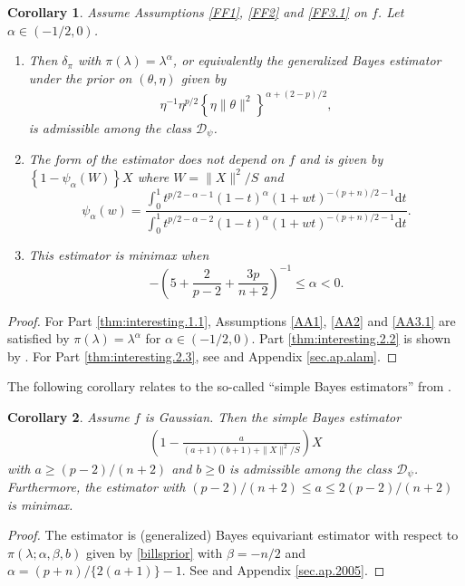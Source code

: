\documentclass[preprint,11pt]{imsart}
\numberwithin{equation}{section}
\theoremstyle{plain}
\newtheorem{corollary}{Corollary}[section]
\theoremstyle{definition}
\theoremstyle{remark}
\newcommand{\rd}{\mathrm{d}}
\begin{document}
\begin{corollary}\label{thm:interesting.2.main}
Assume 
Assumptions \ref{FF1}, \ref{FF2} and \ref{FF3.1} on $f$. Let $\alpha\in(-1/2,0)$.
 \begin{enumerate}
  \item \label{thm:interesting.2.1}
	Then $\delta_\pi$ with $\pi(\lambda)=\lambda^{\alpha} $,
	or equivalently the generalized Bayes estimator under
the prior on $(\theta,\eta)$ given by 
 \begin{align*}
  \eta^{-1}\eta^{p/2}\left\{\eta\|\theta\|^2\right\}^{\alpha+(2-p)/2},
 \end{align*}
	is admissible among the class $\mathcal{D}_\psi$. 
  \item \label{thm:interesting.2.2}
	The form of the estimator does not depend on $f$ and is given by
$\left\{1-\psi_\alpha(W)\right\}X$ where $W=\|X\|^2/S$ and
	\begin{equation}\label{psialphageneral}
 \psi_\alpha(w)=
  \frac{\int_0^1 t^{p/2-\alpha-1}(1-t)^{\alpha}(1+wt)^{-(p+n)/2-1}\rd t}
  {\int_0^1 t^{p/2-\alpha-2}(1-t)^{\alpha}(1+wt)^{-(p+n)/2-1}\rd t}.
	\end{equation}
  \item \label{thm:interesting.2.3}
	This estimator is minimax when
\begin{equation*}
 -\left(5+\frac{2}{p-2}+\frac{3p}{n+2}\right)^{-1} \leq \alpha <0.
\end{equation*}
 \end{enumerate}
\end{corollary}
\begin{proof}
 For Part \ref{thm:interesting.1.1}, Assumptions \ref{AA1}, \ref{AA2} and \ref{AA3.1} are satisfied by
 $\pi(\lambda)=\lambda^\alpha$ for $\alpha\in(-1/2,0)$.
 Part \ref{thm:interesting.2.2} is shown by \cite{Maruyama-2003b}.
 For Part \ref{thm:interesting.2.3}, see \cite{Maruyama-Strawderman-2009}
 and Appendix \ref{sec.ap.alam}.
\end{proof}

The following corollary relates to the so-called ``simple Bayes estimators'' from \cite{Maru-Straw-2005}.
\begin{corollary}\label{thm:interesting.3.main}
 Assume $f$ is Gaussian. Then
 the simple Bayes estimator
\begin{align*}
 \left(1-\frac{a}{(a+1)(b+1)+\|X\|^2/S}\right)X
\end{align*}
with $a\geq (p-2)/(n+2)$ and $b\geq 0$ is admissible among the class $\mathcal{D}_\psi$.
Furthermore, the estimator with $(p-2)/(n+2)\leq a\leq 2(p-2)/(n+2)$ is minimax.
\end{corollary}
\begin{proof}
 The estimator is (generalized) Bayes equivariant estimator with respect to
 $\pi(\lambda;\alpha,\beta,b)$ given by \eqref{billsprior}
 with $\beta=-n/2$ and $\alpha=(p+n)/\{2(a+1)\}-1$. 
 See \cite{Maru-Straw-2005} and Appendix \ref{sec.ap.2005}.
\end{proof}
\end{document}
